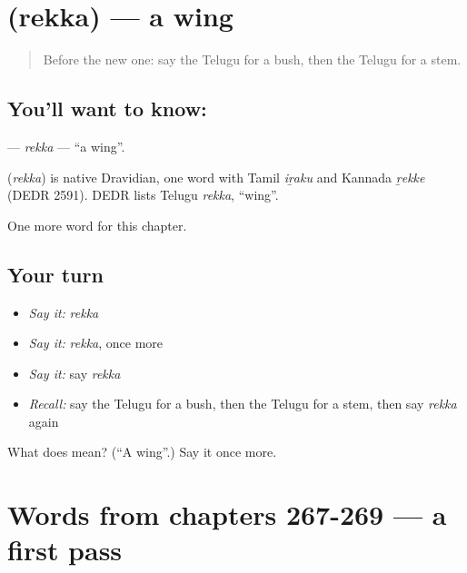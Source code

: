 \section[\texorpdfstring{\te{రెక్క} (rekka)}{రెక్క (rekka)}]{ (rekka) — a wing}

\label{lesson:TE-C272-rekka}



\begin{quote}
Before the new one: say the Telugu for a bush, then the Telugu for a stem.
\end{quote}

\subsection*{You'll want to know: }
\textbf{} — \emph{rekka} — \textquotedblleft{}a wing\textquotedblright{}.

\begin{cousinweb}
\textbf{} (\emph{rekka}) is native Dravidian, one word with Tamil \emph{iṟaku} and Kannada \emph{ṟekke} (DEDR 2591). DEDR lists Telugu \emph{rekka}, \textquotedblleft{}wing\textquotedblright{}.
\end{cousinweb}

\begin{grammarlens}[title={What you've built}]
One more word for this chapter.
\end{grammarlens}

\subsection*{Your turn}
\begin{itemize}
\raggedright
  \item \emph{Say it:} \emph{rekka}
  \item \emph{Say it:} \emph{rekka}, once more
  \item \emph{Say it:} say \emph{rekka}
  \item \emph{Recall:} say the Telugu for a bush, then the Telugu for a stem, then say \emph{rekka} again
\end{itemize}

\begin{tcolorbox}[breakable,colback=teal!4,colframe=teal!35!black,title={Before you move on}]
What does  mean? (\textquotedblleft{}A wing\textquotedblright{}.) Say it once more.
\end{tcolorbox}
\section[(dialogue)]{Words from chapters 267-269 — a first pass}

